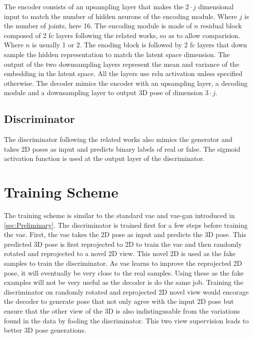 The encoder consists of an upsampling layer that makes the $2 \cdot j$ dimensional input to match the number of hidden neurons of the encoding module. Where $j$ is the number of joints, here 16. The encoding module is made of $n$ residual block composed of 2 \ac{fc} layers following the related works, so as to allow comparision. Where $n$ is usually 1 or 2. The enoding block is followed by 2 \ac{fc} layers that down sample the hidden representation to match the latent space dimension. The output of the two downsampling layers represent the mean and variance of the embedding in the latent space. All the layers use \ac{relu} activation unless specified otherwise. The decoder mimics the encoder with an upsampling layer, a decoding module and a downsampling layer to output 3D pose of dimension $3 \cdot j$.

\subsection{Discriminator}%
The discriminator following the related works also mimics the generator and takes 2D poses as input and predicts binary labels of real or false. The sigmoid activation function is used at the output layer of the discriminator.


\section{Training Scheme}
The training scheme is similar to the standard \ac{vae} and \ac{vae}-\ac{gan} introduced in \ref{sec:Preliminary}. The discriminator is trained first for a few steps before training the \ac{vae}. First, the \ac{vae} takes the 2D pose as input and predicts the 3D pose. This predicted 3D pose is first reprojected to 2D to train the \ac{vae} and then randomly rotated and reprojected to a novel 2D view. This novel 2D is used as the fake samples to train the discriminator. As \ac{vae} learns to improve the reprojected 2D pose, it will eventually be very close to the real samples. Using these as the fake examples will not be very useful as the decoder is do the same job. Training the discriminator on randomly rotated and reprojected 2D novel view would encorage the decoder to generate pose that not only agree with the input 2D pose but ensure that the other view of the 3D is also indistingusable from the variations found in the data by fooling the discriminator. This two view supervision leads to better 3D pose generations.


